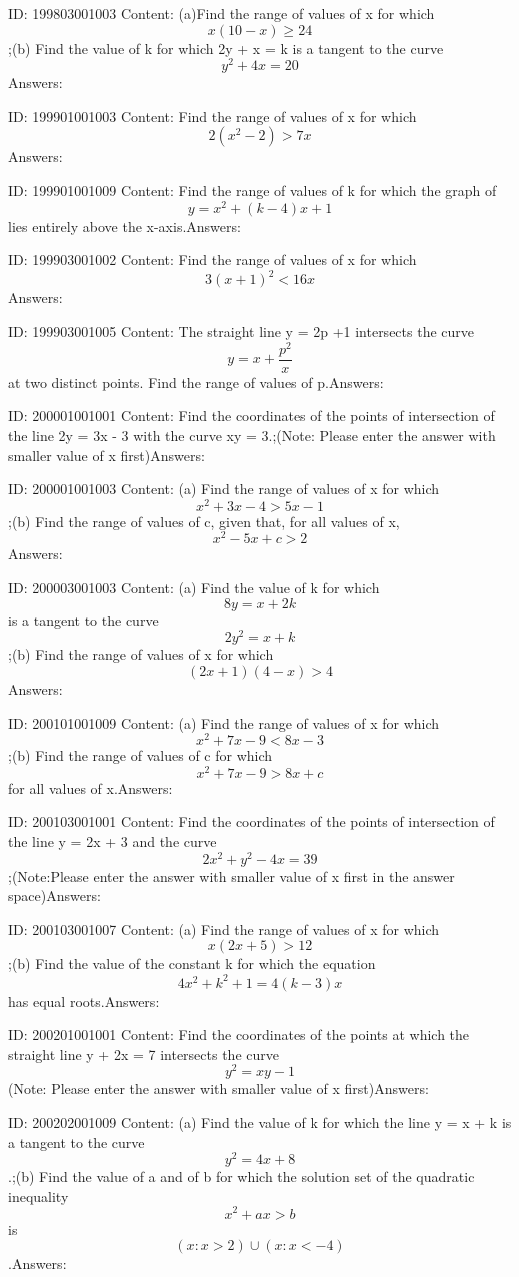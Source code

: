 \documentclass{article}
\begin{document}
ID: 199803001003
Content:
(a)Find the range of values of x for which \[x(10-x)\geq 24\];(b) Find the value of k for which 2y + x = k is a tangent to the curve \[y^2+4x=20\]Answers:

ID: 199901001003
Content:
Find the range of values of x for which \[2(x^2-2)>7x\]Answers:

ID: 199901001009
Content:
Find the range of values of k for which the graph of \[y=x^2+(k-4)x+1\] lies entirely above the x-axis.Answers:

ID: 199903001002
Content:
Find the range of values of x for which \[3(x+1)^2<16x\]Answers:

ID: 199903001005
Content:
The straight line y = 2p +1 intersects the curve \[y=x+\frac{p^{2}}{x}\] at two distinct points. Find the range of values of p.Answers:

ID: 200001001001
Content:
Find the coordinates of the points of intersection of the line 2y = 3x - 3 with the curve xy = 3.;(Note: Please enter the answer with smaller value of x first)Answers:

ID: 200001001003
Content:
(a)	Find the range of values of x for which \[x^2+3x-4>5x-1\];(b)	Find the range of values of c, given that, for all values of x, \[x^2-5x+c>2\]Answers:

ID: 200003001003
Content:
(a) Find the value of k for which \[8y = x + 2k\] is a tangent to the curve \[2y^2=x+k\];(b) Find the range of values of x for which \[(2x + 1)(4 - x) > 4\]Answers:

ID: 200101001009
Content:
(a) Find the range of values of x for which \[x^2+7x-9<8x-3\];(b) Find the range of values of c for which \[x^2+7x-9>8x+c\] for all values of x.Answers:

ID: 200103001001
Content:
Find the coordinates of the points of intersection of the line y = 2x + 3 and the curve \[2x^2+y^2-4x=39\];(Note:Please enter the answer with smaller value of x first in the answer space)Answers:

ID: 200103001007
Content:
(a)	Find the range of values of x for which \[x(2x + 5) > 12\];(b)	Find the value of the constant k for which the equation \[4x^2+k^2+1=4(k-3)x\] has equal roots.Answers:

ID: 200201001001
Content:
Find the coordinates of the points at which the straight line y + 2x = 7 intersects the curve $$y^2=xy-1$$ (Note: Please enter the answer with smaller value of x first)Answers:

ID: 200202001009
Content:
(a)	Find the value of k for which the line y = x + k is a tangent to the curve $$y^2=4x+8$$.;(b)	Find the value of a and of b for which the solution set of the quadratic inequality $$x^2+ax>b$$ is $$(x:x>2) \cup (x:x<-4)$$.Answers:
\end{document}
